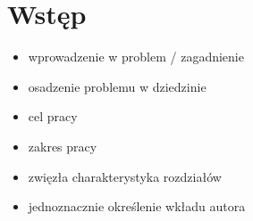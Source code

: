 
\chapter{Wstęp}
{

 \begin{itemize}
     \item wprowadzenie w problem / zagadnienie
     \item osadzenie problemu w dziedzinie
     \item cel pracy
     \item zakres pracy
     \item zwięzła charakterystyka rozdziałów
     \item jednoznacznie określenie wkładu autora

 \end{itemize}
}


